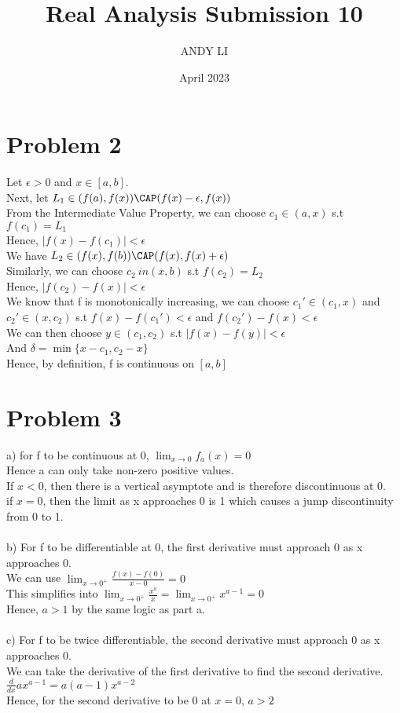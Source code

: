 \documentclass{article}
\title{Real Analysis Submission 10}
\author{ANDY LI}
\date{April 2023}
\begin{document}
\maketitle
\section*{Problem 2}
Let $\epsilon > 0$ and $x \in [a, b]$.
\\Next, let $L_1 \in (f(a), f(x)) \CAP (f(x) - \epsilon, f(x))$
\\From the Intermediate Value Property, we can choose $c_1 \in (a, x)$ s.t $f(c_1) = L_1$
\\Hence, $|f(x) - f(c_1)| < \epsilon$
\\We have $L_2 \in (f(x), f(b)) \CAP (f(x), f(x) + \epsilon)$
\\Similarly, we can choose $c_2 \ in (x, b)$ s.t $f(c_2) = L_2$
\\Hence, $|f(c_2) - f(x)| < \epsilon$
\\We know that f is monotonically increasing, we can choose $c_1' \in (c_1, x)$ and $c_2' \in (x, c_2)$ s.t $f(x) - f(c_1') < \epsilon$ and $f(c_2') - f(x) < \epsilon$
\\We can then choose $y \in (c_1, c_2)$ s.t $|f(x) - f(y)| < \epsilon$
\\And $\delta = \min\{x - c_1, c_2 - x\}$
\\Hence, by definition, f is continuous on $[a, b]$

\section*{Problem 3}
a) for f to be continuous at 0, $\lim_{x \to 0} f_a(x) = 0$
\\Hence a can only take non-zero positive values.
\\If $x < 0$, then there is a vertical asymptote and is therefore discontinuous at 0.
\\if $x = 0$, then the limit as x approaches 0 is 1 which causes a jump discontinuity from 0 to 1.
\\
\\b) For f to be differentiable at 0, the first derivative must approach 0 as x approaches 0.
\\We can use $\lim_{x \to 0^+}\frac{f(x) - f(0)}{x - 0} = 0$
\\This simplifies into $\lim_{x \to 0^+}\frac{x^a}{x} = \lim_{x \to 0^+} x^{a - 1} = 0$
\\Hence, $a > 1$ by the same logic as part a.
\\
\\c) For f to be twice differentiable, the second derivative must approach 0 as x approaches 0.
\\We can take the derivative of the first derivative to find the second derivative. $\frac{d}{dx}ax^{a-1} = a(a-1)x^{a-2}$
\\Hence, for the second derivative to be 0 at $x = 0$, $a > 2$
\end{document}
